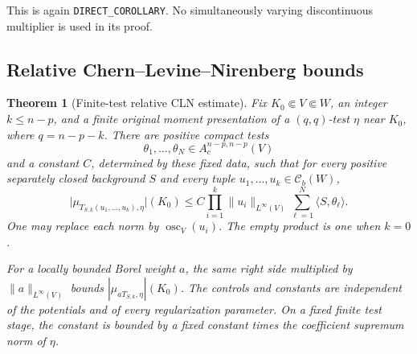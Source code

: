 \documentclass[11pt,a4paper]{article}
\numberwithin{equation}{section}
\newtheorem{theorem}{Theorem}[section]
\theoremstyle{definition}
\theoremstyle{remark}
\begin{document}
This is again \texttt{DIRECT\_COROLLARY}. No simultaneously varying
discontinuous multiplier is used in its proof.

\subsection{Relative Chern--Levine--Nirenberg bounds}

\begin{theorem}[Finite-test relative CLN estimate]
\label{thm:finite-test-cln}
Fix $K_0\Subset V\Subset W$, an integer $k\leq n-p$, and a finite
original moment presentation of a $(q,q)$-test $\eta$ near $K_0$, where
$q=n-p-k$. There are positive compact tests
\[
 \theta_1,\ldots,\theta_N\in A_c^{n-p,n-p}(V)
\]
and a constant $C$, determined by these fixed data, such that for every
positive separately closed background $S$ and every tuple
$u_1,\ldots,u_k\in\mathcal C_b(W)$,
\begin{equation}\label{eq:relative-cln-product}
 \bigl|\mu_{T_{S,k}(u_1,\ldots,u_k),\eta}\bigr|(K_0)
 \leq C\prod_{i=1}^k\|u_i\|_{L^\infty(V)}
       \sum_{\ell=1}^N\langle S,\theta_\ell\rangle.
\end{equation}
One may replace each norm by $\operatorname{osc}_V(u_i)$.
The empty product is one when $k=0$.

For a locally bounded Borel weight $a$, the same right side multiplied
by $\|a\|_{L^\infty(V)}$ bounds
$|\mu_{aT_{S,k},\eta}|(K_0)$.
The controls and constants are independent of the potentials and of
every regularization parameter. On a fixed finite test stage, the
constant is bounded by a fixed constant times the coefficient
supremum norm of $\eta$.
\end{theorem}
\end{document}
